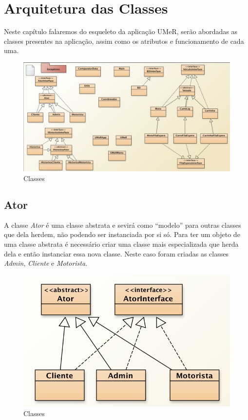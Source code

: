 \chapter{Arquitetura das Classes}
Neste capítulo falaremos do esqueleto da  aplicação UMeR, serão abordadas as classes presentes na aplicação, assim como os atributos e funcionamento de cada uma.
\begin{figure}[htb]
	\centering
	\includegraphics[scale=0.45]{imagem/esquemaClasses}
	\caption{Classes }
	\label{p2:fig:p2_classes}
\end{figure}

\newpage
\section{Ator}
A classe  \textit{Ator} é uma classe abstrata e sevirá  como “modelo” para outras classes que dela herdem, não podendo ser instanciada por si só. Para ter um objeto de uma classe abstrata é necessário criar uma classe mais especializada que herda dela e então instanciar essa nova classe. Neste caso foram criadas as classes \textit{Admin}, \textit{Cliente} e  \textit{Motorista}. 


\begin{figure}[htpb]
	\centering
	\includegraphics[scale=0.6]{imagem/atores}
	\caption{Classes }
	\label{p2:fig:p2_atoresr}
\end{figure}

